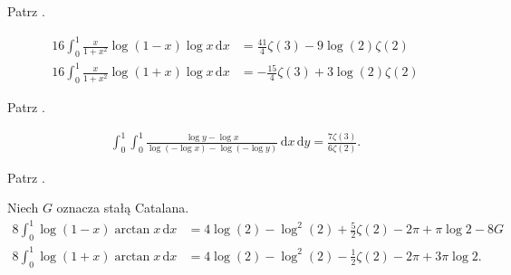 \begin{solution}
    Patrz \cite[s. 8]{valean19}.
\end{solution}


\begin{problem_with_solution}
    \label{valean_1_14}%
    \begin{align}
        16 \int_0^1 \frac{x}{1+ x^2} \log (1 - x) \log x \,\mathrm{d}x & = \frac{41}{4} \zeta(3) - 9 \log(2) \zeta(2) \\
        16 \int_0^1 \frac{x}{1+ x^2} \log (1 + x) \log x \,\mathrm{d}x & = -\frac{15}{4} \zeta(3) + 3 \log(2) \zeta(2)
    \end{align} 
\end{problem_with_solution}


\begin{solution}
    Patrz \cite[s. 8]{valean19}.
\end{solution}

\begin{problem_with_solution}
    \label{valean_1_17}%
    \begin{align}
        \int_0^1 \int_0^1 \frac{\log y - \log x}{\log (- \log x) - \log(- \log y)} \,\mathrm{d}x \,\mathrm{d}y = \frac{7 \zeta(3)}{6 \zeta (2)}.
    \end{align} 
\end{problem_with_solution}


\begin{solution}
    Patrz \cite[s. 10]{valean19}.
\end{solution}

\begin{problem_with_solution}
    \label{valean_1_18}%
    Niech $G$ oznacza stałą Catalana.
    \begin{align}
        8 \int_0^1 \log (1 - x) \arctan x \,\mathrm{d}x & = 4 \log (2) - \log^2 (2) + \frac 5 2 \zeta(2) - 2 \pi + \pi \log 2 - 8 G \\
        8 \int_0^1 \log (1 + x) \arctan x \,\mathrm{d}x & = 4 \log (2) - \log^2 (2) - \frac 1 2 \zeta(2) - 2 \pi + 3 \pi \log 2.
    \end{align} 
\end{problem_with_solution}

